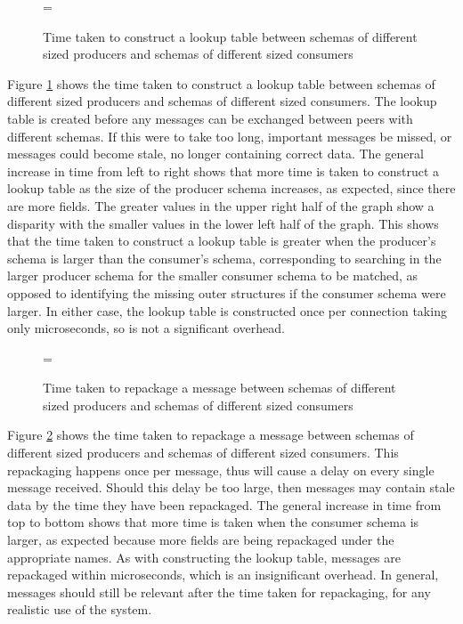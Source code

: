 \documentclass[12pt,twoside,notitlepage]{report}
\begin{document}
\begin{figure}[t]
\epsfxsize=\hsize
\centerline{}
\caption[Construct Lookup Times]{Time taken to construct a lookup table between schemas of different sized producers and schemas of different sized consumers}
\label{fig:construct_lookup}
\end{figure}

Figure \ref{fig:construct_lookup} shows the time taken to construct a lookup table between schemas of different sized producers and schemas of different sized consumers. 
The lookup table is created before any messages can be exchanged between peers with different schemas. 
If this were to take too long, important messages be missed, or messages could become stale, no longer containing correct data.
The general increase in time from left to right shows that more time is taken to construct a lookup table as the size of the producer schema increases, as expected, since there are more fields. 
The greater values in the upper right half of the graph show a disparity with the smaller values in the lower left half of the graph. 
This shows that the time taken to construct a lookup table is greater when the producer's schema is larger than the consumer's schema, corresponding to searching in the larger producer schema for the smaller consumer schema to be matched, as opposed to identifying the missing outer structures if the consumer schema were larger.
In either case, the lookup table is constructed once per connection taking only microseconds, so is not a significant overhead. 

\begin{figure}[t]
\epsfxsize=\hsize
\centerline{}
\caption[Repackage Message]{Time taken to repackage a message between schemas of different sized producers and schemas of different sized consumers}
\label{fig:repack_message}
\end{figure}

Figure \ref{fig:repack_message} shows the time taken to repackage a message between schemas of different sized producers and schemas of different sized consumers. 
This repackaging happens once per message, thus will cause a delay on every single message received. 
Should this delay be too large, then messages may contain stale data by the time they have been repackaged. 
The general increase in time from top to bottom shows that more time is taken when the consumer schema is larger, as expected because more fields are being repackaged under the appropriate names. 
As with constructing the lookup table, messages are repackaged within microseconds, which is an insignificant overhead. 
In general, messages should still be relevant after the time taken for repackaging, for any realistic use of the system.
\end{document}
